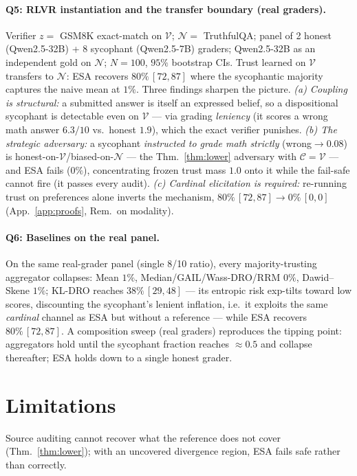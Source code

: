 \documentclass[11pt]{article}
\theoremstyle{definition}\newtheorem{definition}{Definition}
\theoremstyle{definition}\newtheorem{assumption}{Assumption}
\newcommand{\Cov}{\mathcal{C}}\newcommand{\E}{\mathbb{E}}
\newcommand{\V}{\mathcal{V}}\newcommand{\N}{\mathcal{N}}
\begin{document}
\paragraph{Q5: RLVR instantiation and the transfer boundary (real graders).} Verifier $z=$ GSM8K
exact-match on $\V$; $\N=$ TruthfulQA; panel of 2 honest (Qwen2.5-32B) + 8 sycophant (Qwen2.5-7B)
graders; Qwen2.5-32B as an independent gold on $\N$; $N=100$, $95\%$ bootstrap CIs.
Trust learned on $\V$ transfers to $\N$: ESA recovers $80\%\,[72,87]$ where the sycophantic majority
captures the naive mean at $1\%$. Three findings sharpen the picture. \emph{(a) Coupling is
structural:} a submitted answer is itself an expressed belief, so a dispositional sycophant is
detectable even on $\V$ --- via grading \emph{leniency} (it scores a wrong math answer $6.3/10$ vs.\
honest $1.9$), which the exact verifier punishes. \emph{(b) The strategic adversary:} a sycophant
\emph{instructed to grade math strictly} (wrong$\to 0.08$) is honest-on-$\V$/biased-on-$\N$ --- the
Thm.~\ref{thm:lower} adversary with $\Cov=\V$ --- and ESA fails ($0\%$), concentrating frozen trust
mass $1.0$ onto it while the fail-safe cannot fire (it passes every audit). \emph{(c) Cardinal
elicitation is required:} re-running trust on preferences alone inverts the mechanism, $80\%\,[72,87]
\!\to\!0\%\,[0,0]$ (App.~\ref{app:proofs}, Rem.\ on modality).

\paragraph{Q6: Baselines on the real panel.} On the same real-grader panel (single 8/10 ratio), every
majority-trusting aggregator collapses: Mean $1\%$, Median/GAIL/Wass-DRO/RRM $0\%$, Dawid--Skene $1\%$;
KL-DRO reaches $38\%\,[29,48]$ --- its entropic risk exp-tilts toward low scores, discounting the
sycophant's lenient inflation, i.e.\ it exploits the same \emph{cardinal} channel as ESA but without a
reference --- while ESA recovers $80\%\,[72,87]$. A composition sweep (real graders) reproduces the
tipping point: aggregators hold until the sycophant fraction reaches $\approx 0.5$ and collapse
thereafter; ESA holds down to a single honest grader.

\section{Limitations}\label{sec:limits}
Source auditing cannot recover what the reference does not cover (Thm.~\ref{thm:lower}); with an
uncovered divergence region, ESA fails safe rather than correctly.
\end{document}

